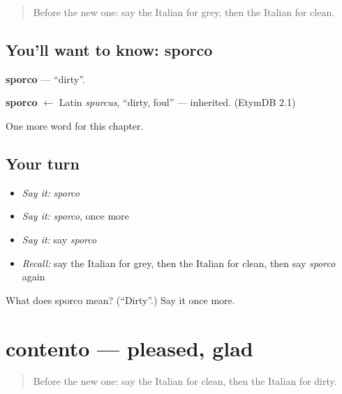 \label{lesson:IT-C77-sporco}



\begin{quote}
Before the new one: say the Italian for grey, then the Italian for clean.
\end{quote}

\subsection*{You'll want to know: sporco}
\textbf{sporco} — \textquotedblleft{}dirty\textquotedblright{}.

\begin{cousinweb}
\textbf{sporco} $\leftarrow$ Latin \emph{spurcus}, \textquotedblleft{}dirty, foul\textquotedblright{} — inherited. (EtymDB 2.1)
\end{cousinweb}

\begin{grammarlens}[title={What you've built}]
One more word for this chapter.
\end{grammarlens}

\subsection*{Your turn}
\begin{itemize}
\raggedright
  \item \emph{Say it:} \emph{sporco}
  \item \emph{Say it:} \emph{sporco}, once more
  \item \emph{Say it:} say \emph{sporco}
  \item \emph{Recall:} say the Italian for grey, then the Italian for clean, then say \emph{sporco} again
\end{itemize}

\begin{tcolorbox}[breakable,colback=teal!4,colframe=teal!35!black,title={Before you move on}]
What does sporco mean? (\textquotedblleft{}Dirty\textquotedblright{}.) Say it once more.
\end{tcolorbox}
\section[contento]{contento — pleased, glad}

\label{lesson:IT-C77-contento}



\begin{quote}
Before the new one: say the Italian for clean, then the Italian for dirty.
\end{quote}

